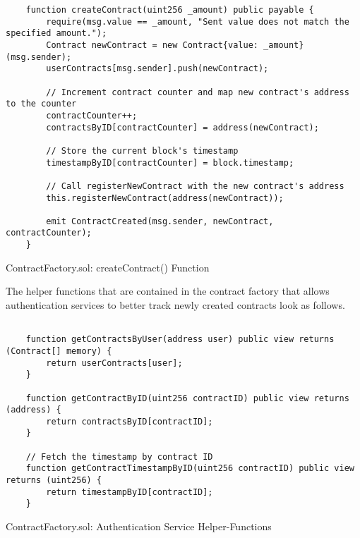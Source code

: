 \lstset{
  basicstyle=\footnotesize\ttfamily,
  breaklines=true,
  numbers=left,
  firstnumber=39,
}

\begin{Listing}
\begin{lstlisting}
    function createContract(uint256 _amount) public payable {
        require(msg.value == _amount, "Sent value does not match the specified amount.");
        Contract newContract = new Contract{value: _amount}(msg.sender);
        userContracts[msg.sender].push(newContract);

        // Increment contract counter and map new contract's address to the counter
        contractCounter++;
        contractsByID[contractCounter] = address(newContract);
        
        // Store the current block's timestamp
        timestampByID[contractCounter] = block.timestamp;

        // Call registerNewContract with the new contract's address
        this.registerNewContract(address(newContract));

        emit ContractCreated(msg.sender, newContract, contractCounter);
    }
\end{lstlisting}
  \caption{ContractFactory.sol: createContract() Function}
  \label{lst:setRideRating}
\end{Listing}



The helper functions that are contained in the contract factory that allows authentication services to better track newly created contracts look as follows.

\lstset{
  basicstyle=\footnotesize\ttfamily,
  breaklines=true,
  numbers=left,
  firstnumber=57
}

\begin{Listing}
\begin{lstlisting}

    function getContractsByUser(address user) public view returns (Contract[] memory) {
        return userContracts[user];
    }

    function getContractByID(uint256 contractID) public view returns (address) {
        return contractsByID[contractID];
    }

    // Fetch the timestamp by contract ID
    function getContractTimestampByID(uint256 contractID) public view returns (uint256) {
        return timestampByID[contractID];
    }

\end{lstlisting}
  \caption{ContractFactory.sol: Authentication Service Helper-Functions}
  \label{lst:helperFunctions}
\end{Listing}





